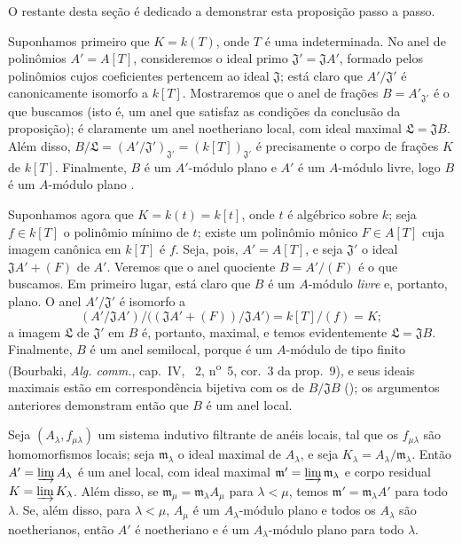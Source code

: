 O restante desta seção é dedicado a demonstrar esta proposição passo a passo.
\begin{env}[10.3.1.1]
\label{0.10.3.1.1}
Suponhamos primeiro que $K=k(T)$, onde $T$ é uma indeterminada.
No anel de polinômios $A'=A[T]$, consideremos o ideal primo $\mathfrak{J}'=\mathfrak{J}A'$, formado pelos
polinômios cujos coeficientes pertencem ao ideal $\mathfrak{J}$;
está claro que $A'/\mathfrak{J}'$ é canonicamente isomorfo a $k[T]$.
Mostraremos que o anel de frações $B=A'_{\mathfrak{J}'}$ é o que buscamos (isto é, um anel que satisfaz as condições da conclusão da proposição);
é claramente um anel noetheriano local, com ideal maximal $\mathfrak{L}=\mathfrak{J}B$.
Além disso, $B/\mathfrak{L}=(A'/\mathfrak{J}')_{\mathfrak{J}'}=(k[T])_{\mathfrak{J}'}$ é precisamente o corpo de frações $K$ de $k[T]$.
Finalmente, $B$ é um $A'$-módulo plano e $A'$ é um $A$-módulo livre, logo $B$ é um $A$-módulo plano .
\end{env}

\begin{env}[10.3.1.2]
\label{0.10.3.1.2}
Suponhamos agora que $K=k(t)=k[t]$, onde $t$ é algébrico sobre $k$;
seja $f\in k[T]$ o polinômio mínimo de $t$;
existe um polinômio mônico $F\in A[T]$ cuja imagem canônica em $k[T]$ é $f$.
Seja, pois, $A'=A[T]$, e seja $\mathfrak{J}'$ o ideal $\mathfrak{J}A'+(F)$ de $A'$.
Veremos que o anel quociente $B=A'/(F)$ é o que buscamos.
Em primeiro lugar, está claro que $B$ é um $A$-módulo \emph{livre} e, portanto, plano.
O anel $A'/\mathfrak{J}'$ é isomorfo a
\[
  (A'/\mathfrak{J}A')/\big((\mathfrak{J}A'+(F))/\mathfrak{J}A'\big)=k[T]/(f)=K;
\]
a imagem $\mathfrak{L}$ de $\mathfrak{J}'$ em $B$ é, portanto, maximal, e temos evidentemente $\mathfrak{L}=\mathfrak{J}B$.
Finalmente, $B$ é um anel semilocal, porque é um $A$-módulo de tipo finito (Bourbaki, \emph{Alg. comm.}, cap.~IV, \textsection~2, n\textsuperscript{o}~5, cor.~3 da prop.~9), e seus ideais maximais estão em correspondência bijetiva com os de $B/\mathfrak{J}B$ (\cite[vol.~I, p.~259]{I-13});
os argumentos anteriores demonstram então que $B$ é um anel local.
\end{env}

\begin{lemma}[10.3.1.3]
\label{0.10.3.1.3}
Seja $(A_\lambda,f_{\mu\lambda})$ um sistema indutivo filtrante de anéis locais, tal que os $f_{\mu\lambda}$ são homomorfismos locais;
seja $\mathfrak{m}_\lambda$ o ideal maximal de $A_\lambda$, e seja $K_\lambda=A_\lambda/\mathfrak{m}_\lambda$.
Então $A'=\varinjlim A_\lambda$ é um anel local, com ideal maximal $\mathfrak{m}'=\varinjlim\mathfrak{m}_\lambda$ e corpo residual $K=\varinjlim K_\lambda$.
Além disso, se $\mathfrak{m}_\mu=\mathfrak{m}_\lambda A_\mu$ para $\lambda<\mu$, temos $\mathfrak{m}'=\mathfrak{m}_\lambda A'$ para todo $\lambda$.
Se, além disso, para $\lambda<\mu$, $A_\mu$ é um $A_\lambda$-módulo plano e todos os $A_\lambda$ são noetherianos, então $A'$ é noetheriano e é um $A_\lambda$-módulo plano para todo $\lambda$.
\end{lemma}


